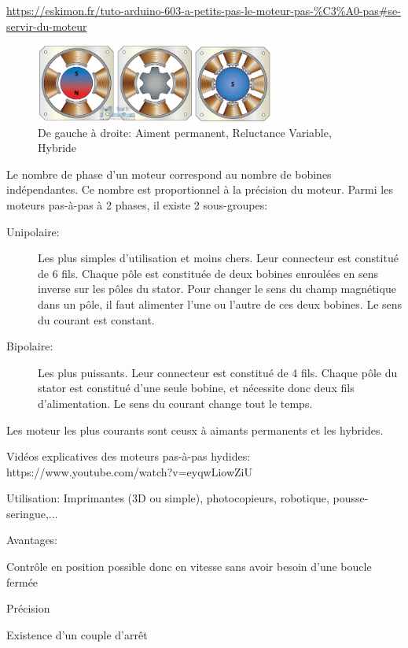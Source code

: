 \documentclass[a4paper, 11pt]{report}
\begin{document}
\url{https://eskimon.fr/tuto-arduino-603-a-petits-pas-le-moteur-pas-\%C3\%A0-pas#se-servir-du-moteur}

\begin{figure}[h]
\begin{centering}
\includegraphics[width=0.7\textwidth]{images/DifferentsMPP.jpg}
\caption{De gauche à droite: Aiment permanent, Reluctance Variable, Hybride}
\par\end{centering}
\end{figure}

Le nombre de phase d'un moteur correspond au nombre de bobines indépendantes. Ce nombre est proportionnel à la précision du moteur.
Parmi les moteurs pas-à-pas à 2 phases, il existe 2 sous-groupes:
\begin{description}
\item[Unipolaire:]Les plus simples d'utilisation et moins chers. Leur connecteur est constitué de 6 fils. Chaque pôle est constituée de deux bobines enroulées en sens inverse sur les pôles du stator. Pour changer le sens du champ magnétique dans un pôle, il faut alimenter l'une ou l'autre de ces deux bobines. Le sens du courant est constant.
\item[Bipolaire:]Les plus puissants. Leur connecteur est constitué de 4 fils. Chaque pôle du stator est constitué d'une seule bobine, et nécessite donc deux fils d'alimentation. Le sens du courant change tout le temps.
\end{description}

Les moteur les plus courants sont ceusx à aimants permanents et les hybrides.

Vidéos explicatives des moteurs pas-à-pas hydides: https://www.youtube.com/watch?v=eyqwLiowZiU

Utilisation: Imprimantes (3D ou simple), photocopieurs, robotique, pousse-seringue,...

Avantages:
\begin{description}
\item Contrôle en position possible donc en vitesse sans avoir besoin d'une boucle fermée
\item Précision
\item Existence d'un couple d'arrêt
\end{description}
\end{document}
